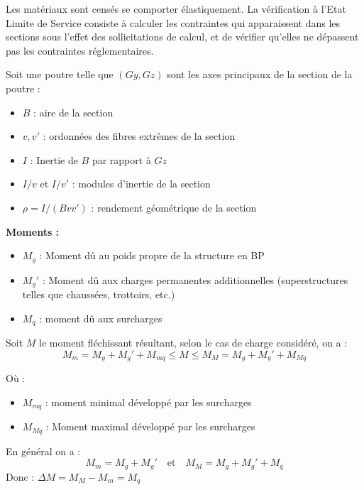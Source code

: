 \documentclass[12pt,a4paper]{article}
\begin{document}
\begin{infobox}
Les matériaux sont censés se comporter élastiquement. La vérification à l'Etat Limite de Service consiste à calculer les contraintes qui apparaissent dans les sections sous l'effet des sollicitations de calcul, et de vérifier qu'elles ne dépassent pas les contraintes réglementaires.
\end{infobox}

Soit une poutre telle que $(Gy, Gz)$ sont les axes principaux de la section de la poutre :
\begin{itemize}
    \item $B$ : aire de la section
    \item $v, v'$ : ordonnées des fibres extrêmes de la section
    \item $I$ : Inertie de $B$ par rapport à $Gz$
    \item $I/v$ et $I/v'$ : modules d'inertie de la section
    \item $\rho = I/(Bvv')$ : rendement géométrique de la section
\end{itemize}

\textbf{Moments :}
\begin{itemize}
    \item $M_g$ : Moment dû au poids propre de la structure en BP
    \item $M_g'$ : Moment dû aux charges permanentes additionnelles (superstructures telles que chaussées, trottoirs, etc.)
    \item $M_q$ : moment dû aux surcharges
\end{itemize}

Soit $M$ le moment fléchissant résultant, selon le cas de charge considéré, on a :
\begin{equation}
M_m = M_g + M_g' + M_{mq} \leq M \leq M_M = M_g + M_g' + M_{Mq}
\end{equation}

Où :
\begin{itemize}
    \item $M_{mq}$ : moment minimal développé par les surcharges
    \item $M_{Mq}$ : Moment maximal développé par les surcharges
\end{itemize}

En général on a :
\begin{equation}
M_m = M_g + M_g' \quad \text{et} \quad M_M = M_g + M_g' + M_q
\end{equation}
Donc : $\Delta M = M_M - M_m = M_q$
\end{document}
